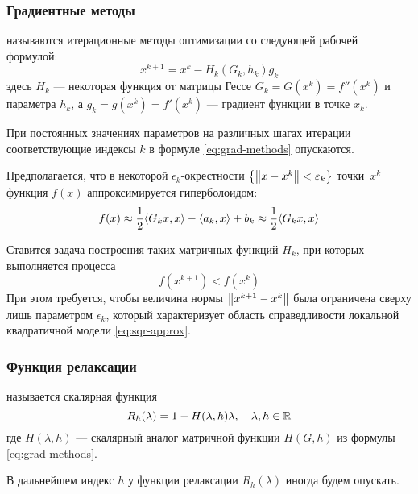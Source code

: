 \subsubsection{Градиентные методы}

\begin{dfn}
   называются итерационные методы оптимизации со
  следующей рабочей формулой:
  \begin{equation}
    \label{eq:grad-methods}
    x^{k+1} = x^k - H_k\left(G_k, h_k\right) g_k
  \end{equation}
  здесь $H_k$ — некоторая функция от матрицы Гессе $G_k = G(x^k) =
  f''(x^k)$ и параметра $h_k$, а $g_k = g(x^k) = f'(x^k)$ — градиент
  функции в точке $x_k$.
\end{dfn}

При постоянных значениях параметров на различных шагах итерации
соответствующие индексы $k$ в формуле \eqref{eq:grad-methods}
опускаются.

Предполагается, что в некоторой $\epsilon_k$-окрестности $\left\{
  \left \lVert{x-x^k}\right \rVert < \varepsilon_k\right\}$ точки $x^k$ функция $f(x)$
аппроксимируется гиперболоидом:
\begin{equation}
  \label{eq:sqr-approx}
  f(x) \approx \frac{1}{2}{\left \langle G_k x, x \right \rangle} - {\left \langle a_k,x \right \rangle} + b_k \approx \frac{1}{2}{\left \langle G_k x, x \right \rangle}
\end{equation}

Ставится задача построения таких матричных функций $H_k$, при которых
выполняется  процесса
\begin{equation}
  \label{eq:relax-cond}
  f(x^{k+1}) < f(x^k)
\end{equation}
При этом требуется, чтобы величина нормы $\left \lVert{x^{k+1}-x^{k}}\right \rVert$ была
ограничена сверху лишь параметром $\epsilon_k$, который характеризует
область справедливости локальной квадратичной модели
\eqref{eq:sqr-approx}.

\subsubsection{Функция релаксации}
\label{sec:relax}
\begin{dfn}
   называется скалярная функция
  \begin{equation}
    \label{eq:relax-fun}
    R_h(\lambda) = 1 - H(\lambda, h)\lambda,\quad \lambda,h \in \mathbb{R}
  \end{equation}
  где $H(\lambda, h)$ — скалярный аналог матричной функции $H(G, h)$
  из формулы \eqref{eq:grad-methods}.
\end{dfn}
В дальнейшем индекс $h$ у функции релаксации $R_h(\lambda)$ иногда
будем опускать.

